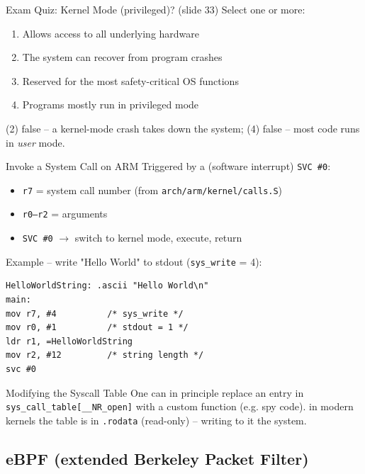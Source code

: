 \begin{example2}{Exam Quiz: Kernel Mode (privileged)? (slide 33)}
    Select one or more:
    \begin{enumerate}
        \item Allows access to all underlying hardware
        \item The system can recover from program crashes
        \item Reserved for the most safety-critical OS functions
        \item Programs mostly run in privileged mode
    \end{enumerate}
    \tcblower
    (2) false -- a kernel-mode crash takes down the system; (4) false -- most code
    runs in \emph{user} mode.
\end{example2}

\begin{KR}{Invoke a System Call on ARM}
    Triggered by a  (software interrupt) \texttt{SVC \#0}:
    \begin{itemize}
        \item \texttt{r7} = system call number (from \texttt{arch/arm/kernel/calls.S})
        \item \texttt{r0--r2} = arguments
        \item \texttt{SVC \#0} $\to$ switch to kernel mode, execute, return
    \end{itemize}
    Example -- write "Hello World" to stdout (\texttt{sys\_write} = 4):
\begin{lstlisting}[style=basesmol, aboveskip=2pt, belowskip=2pt]
HelloWorldString: .ascii "Hello World\n"
main:
mov r7, #4          /* sys_write */
mov r0, #1          /* stdout = 1 */
ldr r1, =HelloWorldString
mov r2, #12         /* string length */
svc #0
\end{lstlisting}
\end{KR}

\begin{remark2}{Modifying the Syscall Table}
    One can in principle replace an entry in \texttt{sys\_call\_table[\_\_NR\_open]}
    with a custom function (e.g. spy code).  in modern kernels the
    table is in \texttt{.rodata} (read-only) -- writing to it  the system.
\end{remark2}

\subsection{eBPF (extended Berkeley Packet Filter)}

